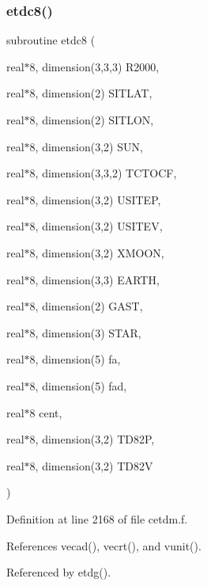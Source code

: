 \subsubsection{\texorpdfstring{etdc8()}{etdc8()}}
{\footnotesize\ttfamily subroutine etdc8 (\begin{DoxyParamCaption}\item[{real$\ast$8, dimension(3,3,3)}]{R2000,  }\item[{real$\ast$8, dimension(2)}]{S\+I\+T\+L\+AT,  }\item[{real$\ast$8, dimension(2)}]{S\+I\+T\+L\+ON,  }\item[{real$\ast$8, dimension(3,2)}]{S\+UN,  }\item[{real$\ast$8, dimension(3,3,2)}]{T\+C\+T\+O\+CF,  }\item[{real$\ast$8, dimension(3,2)}]{U\+S\+I\+T\+EP,  }\item[{real$\ast$8, dimension(3,2)}]{U\+S\+I\+T\+EV,  }\item[{real$\ast$8, dimension(3,2)}]{X\+M\+O\+ON,  }\item[{real$\ast$8, dimension(3,3)}]{E\+A\+R\+TH,  }\item[{real$\ast$8, dimension(2)}]{G\+A\+ST,  }\item[{real$\ast$8, dimension(3)}]{S\+T\+AR,  }\item[{real$\ast$8, dimension(5)}]{fa,  }\item[{real$\ast$8, dimension(5)}]{fad,  }\item[{real$\ast$8}]{cent,  }\item[{real$\ast$8, dimension(3,2)}]{T\+D82P,  }\item[{real$\ast$8, dimension(3,2)}]{T\+D82V }\end{DoxyParamCaption})}



Definition at line 2168 of file cetdm.\+f.



References vecad(), vecrt(), and vunit().



Referenced by etdg().

\mbox{\label{cetdm_8f_af308956ff45f6d291f0f8e9da8e81c54}} 
